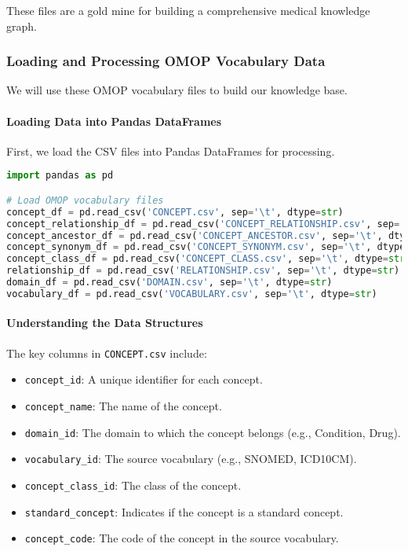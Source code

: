 \documentclass[12pt, a4paper]{article}
\begin{document}
These files are a gold mine for building a comprehensive medical knowledge graph.

\subsubsection{Loading and Processing OMOP Vocabulary Data}

We will use these OMOP vocabulary files to build our knowledge base.

\paragraph{Loading Data into Pandas DataFrames}

First, we load the CSV files into Pandas DataFrames for processing.

\begin{lstlisting}[language=Python]
import pandas as pd

# Load OMOP vocabulary files
concept_df = pd.read_csv('CONCEPT.csv', sep='\t', dtype=str)
concept_relationship_df = pd.read_csv('CONCEPT_RELATIONSHIP.csv', sep='\t', dtype=str)
concept_ancestor_df = pd.read_csv('CONCEPT_ANCESTOR.csv', sep='\t', dtype=str)
concept_synonym_df = pd.read_csv('CONCEPT_SYNONYM.csv', sep='\t', dtype=str)
concept_class_df = pd.read_csv('CONCEPT_CLASS.csv', sep='\t', dtype=str)
relationship_df = pd.read_csv('RELATIONSHIP.csv', sep='\t', dtype=str)
domain_df = pd.read_csv('DOMAIN.csv', sep='\t', dtype=str)
vocabulary_df = pd.read_csv('VOCABULARY.csv', sep='\t', dtype=str)
\end{lstlisting}

\paragraph{Understanding the Data Structures}

The key columns in \texttt{CONCEPT.csv} include:

\begin{itemize}
    \item \texttt{concept\_id}: A unique identifier for each concept.
    \item \texttt{concept\_name}: The name of the concept.
    \item \texttt{domain\_id}: The domain to which the concept belongs (e.g., Condition, Drug).
    \item \texttt{vocabulary\_id}: The source vocabulary (e.g., SNOMED, ICD10CM).
    \item \texttt{concept\_class\_id}: The class of the concept.
    \item \texttt{standard\_concept}: Indicates if the concept is a standard concept.
    \item \texttt{concept\_code}: The code of the concept in the source vocabulary.
\end{itemize}
\end{document}
